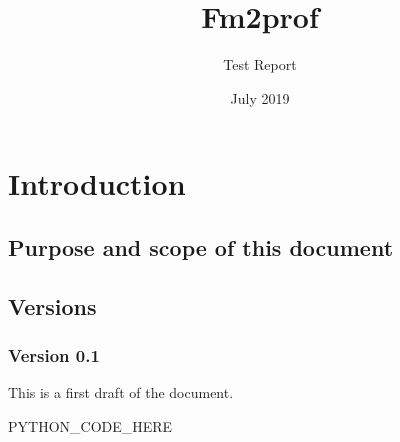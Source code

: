 \documentclass[signature]{deltares_report}
\begin{document}
\pagestyle{empty}
\cleardoublepage
%

\newcommand{\ProgramName}{Fm2prof\xspace}

\title{\ProgramName}
\subtitle{Test Report}
\classification{-}

\date{July 2019}



\summary{}

\revieweri{}
\approvali{}

\disclaimer{}

\deltarestitle

\listoffigures

\chapter{Introduction} 
\label{chapterIntroduction}

\section{Purpose and scope of this document} \label{sec:PurposeAndScope}

\section{Versions}
\label{sec:Versions}

\subsection{Version 0.1}
\label{sec:Version}
This is a first draft of the document.


PYTHON_CODE_HERE

\pagestyle{empty}
\mbox{}

\end{document}
